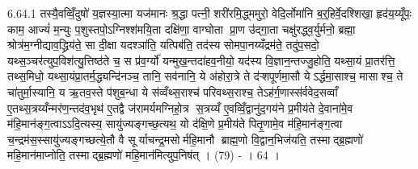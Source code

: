 6.64.1
तस्यै॒वव्विँ॒दुषो॑ य॒ज्ञस्या॒त्मा यज॑मानः श्र॒द्धा पत्नी॒ शरी॑रमि॒द्ध्ममुरो॒ वेदि॒र्लोमा॑नि ब॒र्॒हिर्वे॒दश्शिखा॒ हृद॑य॒य्यूँपः॒ काम॒ आज्यं॑ म॒न्युः प॒शुस्तपो॒ऽग्निश्श॑मयि॒ता दक्षि॑णा॒ वाग्घोता प्रा॒ण उ॑द्गा॒ता चक्षु॑रद्ध्व॒र्युर्मनो॒ ब्रह्मा॒ श्रोत्र॑म॒ग्नीद्याव॒द्ध्रिय॑ते॒ सा दी॒क्षा यदश्ञा॑ति॒ यत्पिब॑ति॒ तद॑स्य सोमपा॒नय्यँद्रम॑ते॒ तदु॑प॒सदो॒ यथ्स॒ञ्चर॑त्युप॒विश॑त्यु॒त्तिष्ठ॑ते च॒ स प्र॑व॒र्ग्यो॑ यन्मुख॒न्तदा॑हव॒नीयो॒ यद॑स्य वि॒ज्ञान॒न्तज्जु॒होति॒ यथ्सा॒यं प्रा॒तर॑त्ति॒ तथ्स॒मिधो॒ यथ्सा॒यंप्रा॒तर्म॒द्ध्यन्दि॑नञ्च॒ तानि॒ सव॑नानि॒ ये अ॑होरा॒त्रे ते द॑ऱ्शपूर्णमा॒सौ येऽर्द्धमा॒साश्च॒ मासाश्च॒ ते चा॑तुर्मा॒स्यानि॒ य ऋ॒तव॒स्ते प॑शुब॒न्धा ये स॑व्वँथ्स॒राश्च॑ परिवथ्स॒राश्च॒ तेऽह॑र्ग॒णास्स॑र्ववेद॒सव्वाँ ए॒तथ्स॒त्रय्यँन्मर॑ण॒न्तद॑व॒भृथ॑ ए॒तद्वै ज॑रामर्यमग्निहो॒त्र स॒त्रय्यँ ए॒वव्विँ॒द्वानु॑द॒गय॑ने प्र॒मीय॑ते दे॒वाना॑मे॒व म॑हि॒मान॑ङ्ग॒त्वाऽऽदि॒त्यस्य॒ सायु॑ज्यङ्गच्छ॒त्यथ॒ यो द॑क्षि॒णे प्र॒मीय॑ते पितृ॒णामे॒व म॑हि॒मान॑ङ्ग॒त्वा च॒न्द्रम॑स॒स्सायु॑ज्यङ्गच्छत्ये॒तौ वै सूर्याचन्द्र॒मसोर्महि॒मानौ ब्राह्म॒णो वि॒द्वान॒भिज॑यति॒ तस्माद्ब्र॒ह्मणो॑ महि॒मान॑माप्नोति॒ तस्माद्ब्र॒ह्मणो॑ महि॒मान॑मित्युप॒निष॑त् । (79) - । 64 ।

